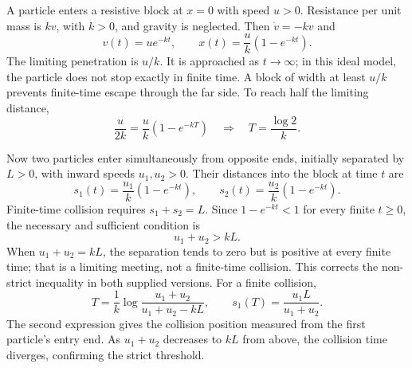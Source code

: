 \begin{example}
A particle enters a resistive block at $x=0$ with speed $u>0$. Resistance
per unit mass is $kv$, with $k>0$, and gravity is neglected.
Then $\dot v=-kv$ and
\[
v(t)=ue^{-kt},\qquad x(t)=\frac uk(1-e^{-kt}).
\]
The limiting penetration is $u/k$. It is approached as $t\to\infty$;
in this ideal model, the particle does not stop exactly in finite time.
A block of width at least $u/k$ prevents finite-time escape through the
far side. To reach half the limiting distance,
\[
\frac u{2k}=\frac uk(1-e^{-kT})
\quad\Longrightarrow\quad T=\frac{\log2}{k}.
\]

Now two particles enter simultaneously from opposite ends, initially
separated by $L>0$, with inward speeds $u_1,u_2>0$.
Their distances into the block at time $t$ are
\[
s_1(t)=\frac{u_1}{k}(1-e^{-kt}),\qquad
s_2(t)=\frac{u_2}{k}(1-e^{-kt}).
\]
Finite-time collision requires $s_1+s_2=L$. Since $1-e^{-kt}<1$ for every
finite $t\geq0$, the necessary and sufficient condition is
\[
\boxed{u_1+u_2>kL}.
\]
When $u_1+u_2=kL$, the separation tends to zero but is positive at every
finite time; that is a limiting meeting, not a finite-time collision.
This corrects the non-strict inequality in both supplied versions.
For a finite collision,
\[
T=\frac1k\log\frac{u_1+u_2}{u_1+u_2-kL},\qquad
s_1(T)=\frac{u_1L}{u_1+u_2}.
\]
The second expression gives the collision position measured from the
first particle's entry end. As $u_1+u_2$ decreases to $kL$ from above,
the collision time diverges, confirming the strict threshold.
\end{example}

